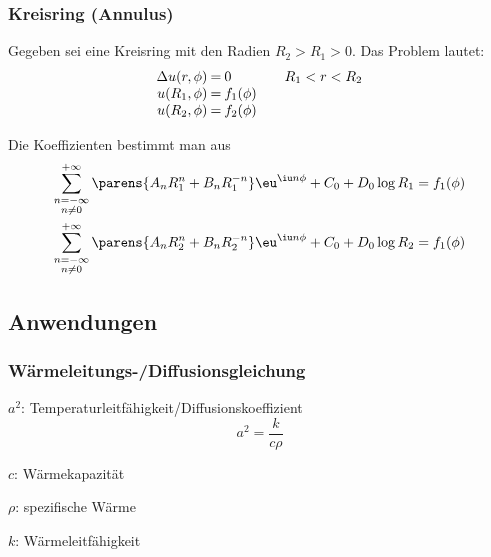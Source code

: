 		\subsubsection{Kreisring (Annulus)} %
			Gegeben sei eine Kreisring mit den Radien $R_2 > R_1 > 0$.
			Das Problem lautet:
			\begin{equation*}
				\begin{array}{r@{\:=\:}l@{\qquad}l}
					\Delta u(r,\phi) & 0 & R_1 < r < R_2 \\
					u(R_1,\phi) & f_1(\phi) \\
					u(R_2,\phi) & f_2(\phi)
				\end{array}
			\end{equation*}
			
			Die Koeffizienten bestimmt man aus
			\begin{align*}
				\sum_{\substack{n=-\infty\\ n\neq 0}}^{+\infty} \parens{
					A_n R_1^n + B_n R_1^{-n}
				} \eu^{\iu n \phi} + C_0 + D_0 \log R_1 &= f_1(\phi) \\
				\sum_{\substack{n=-\infty\\ n\neq 0}}^{+\infty} \parens{
					A_n R_2^n + B_n R_2^{-n}
				} \eu^{\iu n \phi} + C_0 + D_0 \log R_2 &= f_1(\phi)
			\end{align*}
	\subsection{Anwendungen} %
		\subsubsection{Wärmeleitungs-/Diffusionsgleichung} %
			\begin{tightitemize}
				\item[$a^2$:] Temperaturleitfähigkeit/Diffusionskoeffizient
				\begin{equation*}
					a^2 = \frac{k}{c \rho}
				\end{equation*}
				\item[$c$:] Wärmekapazität
				\item[$\rho$:] spezifische Wärme
				\item[$k$:] Wärmeleitfähigkeit
			\end{tightitemize}
		
